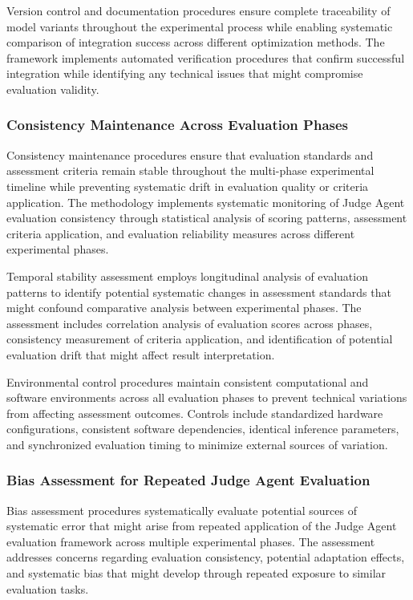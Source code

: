 Version control and documentation procedures ensure complete traceability of model variants throughout the experimental process while enabling systematic comparison of integration success across different optimization methods. The framework implements automated verification procedures that confirm successful integration while identifying any technical issues that might compromise evaluation validity.

\subsubsection{Consistency Maintenance Across Evaluation Phases}

Consistency maintenance procedures ensure that evaluation standards and assessment criteria remain stable throughout the multi-phase experimental timeline while preventing systematic drift in evaluation quality or criteria application. The methodology implements systematic monitoring of Judge Agent evaluation consistency through statistical analysis of scoring patterns, assessment criteria application, and evaluation reliability measures across different experimental phases.

Temporal stability assessment employs longitudinal analysis of evaluation patterns to identify potential systematic changes in assessment standards that might confound comparative analysis between experimental phases. The assessment includes correlation analysis of evaluation scores across phases, consistency measurement of criteria application, and identification of potential evaluation drift that might affect result interpretation.

Environmental control procedures maintain consistent computational and software environments across all evaluation phases to prevent technical variations from affecting assessment outcomes. Controls include standardized hardware configurations, consistent software dependencies, identical inference parameters, and synchronized evaluation timing to minimize external sources of variation.

\subsubsection{Bias Assessment for Repeated Judge Agent Evaluation}

Bias assessment procedures systematically evaluate potential sources of systematic error that might arise from repeated application of the Judge Agent evaluation framework across multiple experimental phases. The assessment addresses concerns regarding evaluation consistency, potential adaptation effects, and systematic bias that might develop through repeated exposure to similar evaluation tasks.

